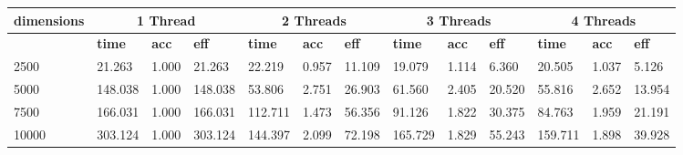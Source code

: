 \documentclass{article}
\begin{document}
\begin{table}[]\begin{tabular}{|l|l|l|l|l|l|l|l|l|l|l|l|l|}\hline
\multicolumn{1}{|c|}{\textbf{dimensions}} & \multicolumn{3}{c|}{\textbf{1 Thread}} & \multicolumn{3}{c|}{\textbf{2 Threads}} & \multicolumn{3}{c|}{\textbf{3 Threads}} & \multicolumn{3}{c|}{\textbf{4 Threads}} \\ \hline
 & \textbf{time} & \textbf{acc} & \textbf{eff} & \textbf{time} & \textbf{acc} & \textbf{eff} & \textbf{time} & \textbf{acc} & \textbf{eff} & \textbf{time} & \textbf{acc} & \textbf{eff}\\ \hline
2500
 & 21.263 & 1.000 & 21.263 & 22.219 & 0.957 & 11.109 & 19.079 & 1.114 & 6.360 & 20.505 & 1.037 & 5.126\\ \hline
5000
 & 148.038 & 1.000 & 148.038 & 53.806 & 2.751 & 26.903 & 61.560 & 2.405 & 20.520 & 55.816 & 2.652 & 13.954\\ \hline
7500
 & 166.031 & 1.000 & 166.031 & 112.711 & 1.473 & 56.356 & 91.126 & 1.822 & 30.375 & 84.763 & 1.959 & 21.191\\ \hline
10000
 & 303.124 & 1.000 & 303.124 & 144.397 & 2.099 & 72.198 & 165.729 & 1.829 & 55.243 & 159.711 & 1.898 & 39.928\\ \hline
\end{tabular}
\end{table}
\end{document}
